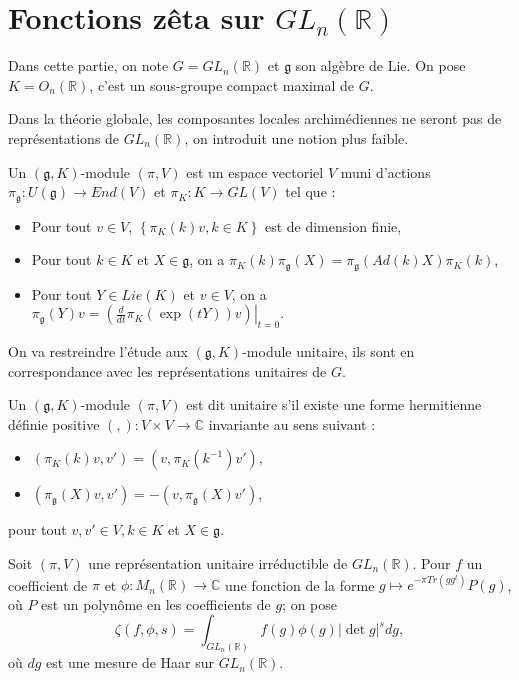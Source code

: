 \section{Fonctions zêta sur $GL_n(\mathbb{R})$}

Dans cette partie, on note $G=GL_n(\mathbb{R})$ et $\mathfrak{g}$ son algèbre de Lie. On pose $K=O_n(\mathbb{R})$, c'est un sous-groupe compact maximal de $G$.

Dans la théorie globale, les composantes locales archimédiennes ne seront pas de représentations de $GL_n(\mathbb{R})$, on introduit une notion plus faible.

\begin{definition}
Un $(\mathfrak{g}, K)$-module $(\pi, V)$ est un espace vectoriel $V$ muni d'actions $\pi_\mathfrak{g} : U(\mathfrak{g}) \rightarrow End(V)$ et $\pi_K : K \rightarrow GL(V)$ tel que :
\begin{itemize}
\item Pour tout $v \in V$, $\left\lbrace \pi_K(k)v, k \in K \right\rbrace$ est de dimension finie,
\item Pour tout $k \in K$ et $X \in \mathfrak{g}$, on a
$\pi_K(k)\pi_\mathfrak{g}(X) = \pi_\mathfrak{g}(Ad(k)X)\pi_K(k)$,
\item Pour tout $Y \in Lie(K)$ et $v \in V$, on a
$\pi_\mathfrak{g}(Y)v = \left.\left(\frac{d}{dt}\pi_K(\exp(tY))v\right)\right|_{t=0}.$
\end{itemize}
\end{definition}

On va restreindre l'étude aux $(\mathfrak{g}, K)$-module unitaire, ils sont en correspondance avec les représentations unitaires de $G$.

\begin{definition}
Un $(\mathfrak{g}, K)$-module $(\pi, V)$ est dit unitaire s'il existe une forme hermitienne définie positive $(,) : V \times V \rightarrow \mathbb{C}$ invariante au sens suivant :
\begin{itemize}
\item $(\pi_K(k)v, v') = (v, \pi_K(k^{-1})v')$,
\item $(\pi_\mathfrak{g}(X)v, v') = -(v, \pi_\mathfrak{g}(X)v')$,
\end{itemize}
pour tout $v, v' \in V, k \in K$ et $X \in \mathfrak{g}$.
\end{definition}

Soit $(\pi, V)$ une représentation unitaire irréductible de $GL_n(\mathbb{R})$. Pour $f$ un coefficient de $\pi$ et $\phi : M_n(\mathbb{R}) \rightarrow \mathbb{C}$ une fonction de la forme
$g \mapsto e^{-\pi Tr(gg^t)}P(g)$, où $P$ est un polynôme en les coefficients de $g$; on pose
\begin{equation}
\zeta(f, \phi, s) = \int_{GL_n(\mathbb{R})} f(g) \phi(g) |\det g|^s dg,
\end{equation}
où $dg$ est une mesure de Haar sur $GL_n(\mathbb{R})$.

